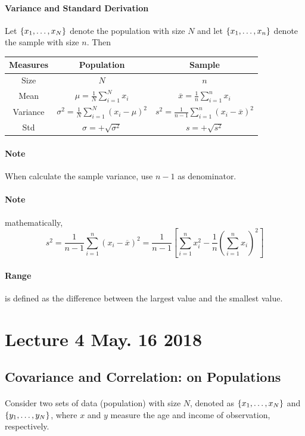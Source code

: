 \documentclass{article}
\begin{document}
		\paragraph{Variance and Standard Derivation} Let $\{{{x}_{1}}, \dots, {{x}_{N}}\}$ denote the population with size $N$ and let $\{{{x}_{1}}, \dots, {{x}_{n}}\}$ denote the sample with size $n$. Then
			\begin{center}
				\begin{tabular}{|c|c|c|}
					\hline
					Measures & Population & Sample \\
					\hline \hline
					Size & $N$ & $n$ \\
					\hline
					Mean & $\mu = \frac{1}{N}\sum_{i=1}^N{x_i}$ & $\overline{x} = \frac{1}{n}\sum_{i=1}^n{x_i}$ \\
					\hline
					Variance & $\sigma^2 = \frac{1}{N}\sum_{i=1}^N{(x_i - \mu)^2}$ & $s^2 = \frac{1}{n-1}\sum_{i=1}^n{(x_i-\overline{x})^2}$ \\
					\hline
					Std & $\sigma = + \sqrt{\sigma^2}$ & $s = +\sqrt{s^2}$ \\
					\hline 
				\end{tabular}
			\end{center}
			\paragraph{Note} When calculate the sample variance, use $n-1$ as denominator.
			\paragraph{Note} mathematically,
			\[
				s^2 = \frac{1}{n-1}\sum_{i=1}^n(x_i - \overline{x})^2 = \frac{1}{n-1}[\sum_{i=1}^n{x_i^2} - \frac{1}{n}(\sum_{i=1}^n{x_i})^2]
			\]
		\paragraph{Range} is defined as the difference between the largest value and the smallest value.
		
		\section{Lecture 4 May. 16 2018}
		\subsection{Covariance and Correlation: on Populations}
		\paragraph{} Consider two sets of data (population) with size $N$, denoted as $\{{{x}_{1}}, \dots, {{x}_{N}}\}$ and $\{{{y}_{1}}, \dots, {{y}_{N}}\}$, where $x$ and $y$ measure the age and income of observation, respectively.
\end{document}
